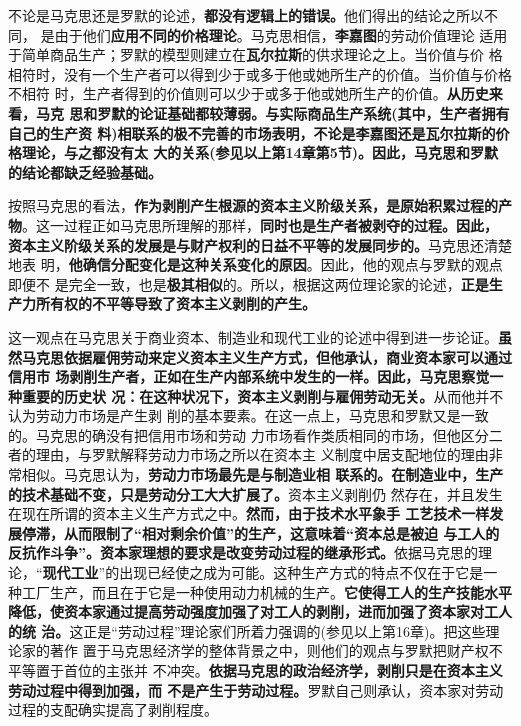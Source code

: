 不论是马克思还是罗默的论述，\textbf{都没有逻辑上的错误。}他们得出的结论之所以不同，
是由于他们\textbf{应用不同的价格理论}。马克思相信，\textbf{李嘉图}的劳动价值理论
适用于简单商品生产；罗默的模型则建立在\textbf{瓦尔拉斯}的供求理论之上。当价值与价
格相符时，没有一个生产者可以得到少于或多于他或她所生产的价值。当价值与价格不相符
时，生产者得到的价值则可以少于或多于他或她所生产的价值。\textbf{从历史来看，马克
  思和罗默的论证基础都较薄弱。与实际商品生产系统(其中，生产者拥有自己的生产资
  料)相联系的极不完善的市场表明，不论是李嘉图还是瓦尔拉斯的价格理论，与之都没有太
  大的关系(参见以上第14章第5节)。因此，马克思和罗默的结论都缺乏经验基础。}

按照马克思的看法，\textbf{作为剥削产生根源的资本主义阶级关系，是原始积累过程的产
  物}。这一过程正如马克思所理解的那样，\textbf{同时也是生产者被剥夺的过程。因此，
  资本主义阶级关系的发展是与财产权利的日益不平等的发展同步的。}马克思还清楚地表
明，\textbf{他确信分配变化是这种关系变化的原因}。因此，他的观点与罗默的观点即便不
是完全一致，也是\textbf{极其相似}的。所以，根据这两位理论家的论述，\textbf{正是生
  产力所有权的不平等导致了资本主义剥削的产生。}

这一观点在马克思关于商业资本、制造业和现代工业的论述中得到进一步论证。\textbf{虽
  然马克思依据雇佣劳动来定义资本主义生产方式，但他承认，商业资本家可以通过信用市
  场剥削生产者，正如在生产内部系统中发生的一样。因此，马克思察觉一种重要的历史状
  况：在这种状况下，资本主义剥削与雇佣劳动无关。}从而他并不认为劳动力市场是产生剥
削的基本要素。在这一点上，马克思和罗默又是一致的。马克思的确没有把信用市场和劳动
力市场看作类质相同的市场，但他区分二者的理由，与罗默解释劳动力市场之所以在资本主
义制度中居支配地位的理由非常相似。马克思认为，\textbf{劳动力市场最先是与制造业相
  联系的。在制造业中，生产的技术基础不变，只是劳动分工大大扩展了。}资本主义剥削仍
然存在，并且发生在现在所谓的资本主义生产方式之中。\textbf{然而，由于技术水平象手
  工艺技术一样发展停滞，从而限制了“相对剩余价值”的生产，这意味着“资本总是被迫
  与工人的反抗作斗争”。资本家理想的要求是改变劳动过程的继承形式。}依据马克思的理
论，“\textbf{现代工业}”的出现已经使之成为可能。这种生产方式的特点不仅在于它是一
种工厂生产，而且在于它是一种使用动力机械的生产。\textbf{它使得工人的生产技能水平
  降低，使资本家通过提高劳动强度加强了对工人的剥削，进而加强了资本家对工人的统
  治。}这正是“劳动过程”理论家们所着力强调的(参见以上第16章)。把这些理论家的著作
置于马克思经济学的整体背景之中，则他们的观点与罗默把财产权不平等置于首位的主张并
不冲突。\textbf{依据马克思的政治经济学，剥削只是在资本主义劳动过程中得到加强，而
  不是产生于劳动过程。}罗默自己则承认，资本家对劳动过程的支配确实提高了剥削程度。

